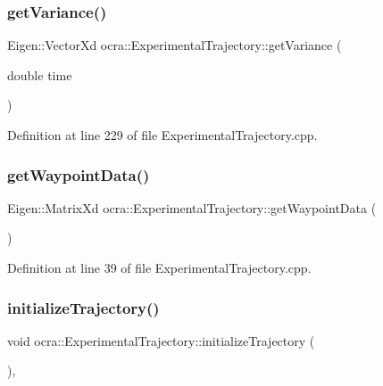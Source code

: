 \subsubsection{\texorpdfstring{get\+Variance()}{getVariance()}}
{\footnotesize\ttfamily Eigen\+::\+Vector\+Xd ocra\+::\+Experimental\+Trajectory\+::get\+Variance (\begin{DoxyParamCaption}\item[{double}]{time }\end{DoxyParamCaption})}



Definition at line 229 of file Experimental\+Trajectory.\+cpp.

\hypertarget{classocra_1_1ExperimentalTrajectory_a5a70f13ad9c0a6c8716972dcbe29b2b0}{}\label{classocra_1_1ExperimentalTrajectory_a5a70f13ad9c0a6c8716972dcbe29b2b0} 
\subsubsection{\texorpdfstring{get\+Waypoint\+Data()}{getWaypointData()}}
{\footnotesize\ttfamily Eigen\+::\+Matrix\+Xd ocra\+::\+Experimental\+Trajectory\+::get\+Waypoint\+Data (\begin{DoxyParamCaption}{ }\end{DoxyParamCaption})}



Definition at line 39 of file Experimental\+Trajectory.\+cpp.

\hypertarget{classocra_1_1ExperimentalTrajectory_a4e214517be9848835a63641578e3269d}{}\label{classocra_1_1ExperimentalTrajectory_a4e214517be9848835a63641578e3269d} 
\subsubsection{\texorpdfstring{initialize\+Trajectory()}{initializeTrajectory()}}
{\footnotesize\ttfamily void ocra\+::\+Experimental\+Trajectory\+::initialize\+Trajectory (\begin{DoxyParamCaption}{ }\end{DoxyParamCaption})\hspace{0.3cm}{\ttfamily [protected]}, {\ttfamily [virtual]}}



